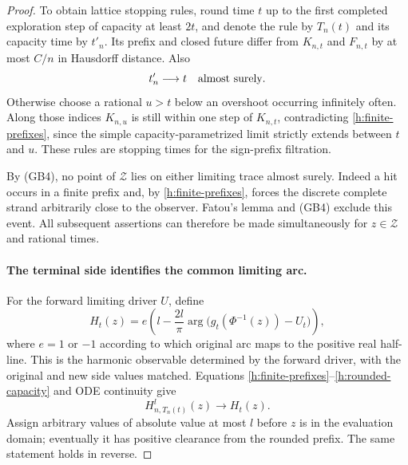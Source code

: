 \begin{proof}
To obtain lattice stopping rules, round time $t$ up to the first
completed exploration step of capacity at least $2t$, and denote the
rule by $T_n(t)$ and its capacity time by $t'_n$. Its prefix and closed
future differ from $K_{n,t}$ and $F_{n,t}$ by at most $C/n$ in Hausdorff
distance. Also
\begin{equation}\label{h:rounded-capacity}
 t'_n\longrightarrow t\quad\hbox{almost surely}.
\end{equation}
Otherwise choose a rational $u>t$ below an overshoot occurring
infinitely often. Along those indices $K_{n,u}$ is still within one
step of $K_{n,t}$, contradicting \eqref{h:finite-prefixes}, since the
simple capacity-parametrized limit strictly extends between $t$ and
$u$. These rules are stopping times for the sign-prefix filtration.

By \textup{(GB4)}, no point of $\mathcal Z$ lies on either limiting
trace almost surely. Indeed a hit occurs in a finite prefix and,
by \eqref{h:finite-prefixes}, forces the discrete complete strand
arbitrarily close to the observer. Fatou's lemma and \textup{(GB4)}
exclude this event. All subsequent assertions can therefore be made
simultaneously for $z\in\mathcal Z$ and rational times.

\paragraph{The terminal side identifies the common limiting arc.}
For the forward limiting driver $U$, define
\[
 H_t(z)=e\left(l-\frac{2l}{\pi}
       \arg\bigl(g_t(\Phi^{-1}(z))-U_t\bigr)\right),
\]
where $e=1$ or $-1$ according to which original arc maps to the
positive real half-line. This is the harmonic observable determined
by the forward driver, with the original and new side values matched.
Equations \eqref{h:finite-prefixes}--\eqref{h:rounded-capacity} and ODE
continuity give
\begin{equation}\label{h:rounded-observable}
 H^l_{n,T_n(t)}(z)\longrightarrow H_t(z).
\end{equation}
Assign arbitrary values of absolute value at most $l$ before $z$ is
in the evaluation domain; eventually it has positive clearance from
the rounded prefix. The same statement holds in reverse.


\end{proof}
